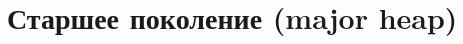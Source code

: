 \documentclass[aspectratio=169
  , xcolor={svgnames} 
  , hyperref={ colorlinks,citecolor=DeepPink4
             , linkcolor=DarkRed,urlcolor=DarkBlue}
  , russian
  ]{beamer}
\theoremstyle{exerciseStyle1}
\begin{document}

\section{Старшее поколение (major heap)}

\end{document}
